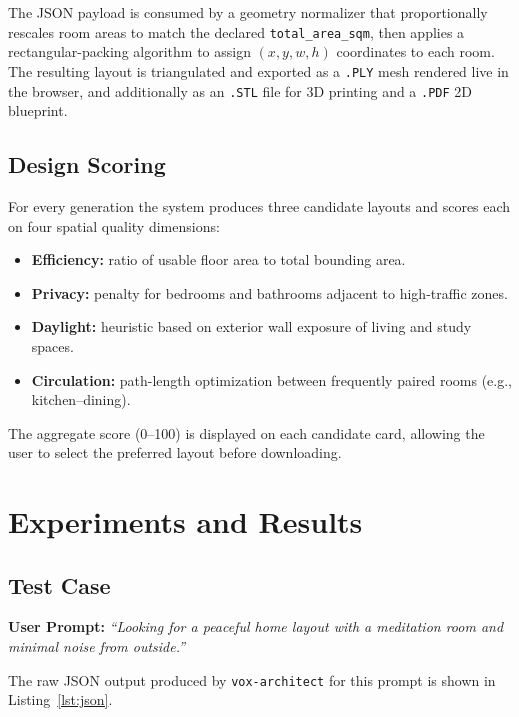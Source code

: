 \documentclass[12pt, a4paper]{article}
\begin{document}
The JSON payload is consumed by a geometry normalizer that proportionally rescales
room areas to match the declared \texttt{total\_area\_sqm}, then applies a
rectangular-packing algorithm to assign $(x, y, w, h)$ coordinates to each room.
The resulting layout is triangulated and exported as a \texttt{.PLY} mesh rendered
live in the browser, and additionally as an \texttt{.STL} file for 3D printing
and a \texttt{.PDF} 2D blueprint.

\subsection{Design Scoring}

For every generation the system produces three candidate layouts and scores each
on four spatial quality dimensions:

\begin{itemize}[leftmargin=1.5em, itemsep=2pt]
    \item \textbf{Efficiency:} ratio of usable floor area to total bounding area.
    \item \textbf{Privacy:} penalty for bedrooms and bathrooms adjacent to
          high-traffic zones.
    \item \textbf{Daylight:} heuristic based on exterior wall exposure of
          living and study spaces.
    \item \textbf{Circulation:} path-length optimization between frequently
          paired rooms (e.g., kitchen--dining).
\end{itemize}

The aggregate score (0--100) is displayed on each candidate card, allowing the
user to select the preferred layout before downloading.

\section{Experiments and Results}

\subsection{Test Case}

\textbf{User Prompt:}
\textit{``Looking for a peaceful home layout with a meditation room and minimal
noise from outside.''}

The raw JSON output produced by \texttt{vox-architect} for this prompt is shown
in Listing~\ref{lst:json}.
\end{document}
